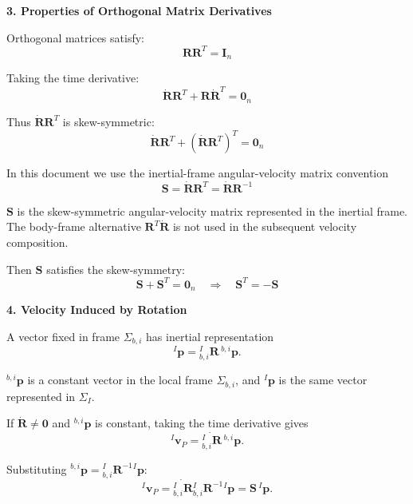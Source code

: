 \documentclass[12pt,a4paper]{report}
\newcommand{\newsymbols}[1]{\par\noindent{}#1\par\vspace{0.35em}}
\newcommand{\vect}[1]{\mathbf{#1}}
\newcommand{\mat}[1]{\mathbf{#1}}
\newcommand{\Frame}[1]{\Sigma_{#1}}
\newcommand{\Rot}[2]{{}_{#1}^{#2}\mathbf{R}}
\begin{document}
\textbf{3. Properties of Orthogonal Matrix Derivatives}

Orthogonal matrices satisfy:
\begin{equation}
\mat{R}\mat{R}^{T} = \mat{I}_{n}
\end{equation}

Taking the time derivative:
\begin{equation}
\dot{\mat{R}}\mat{R}^{T} + \mat{R}\dot{\mat{R}}^{T} = \mat{0}_{n}
\end{equation}

Thus $\dot{\mat{R}}\mat{R}^{T}$ is skew-symmetric:
\begin{equation}
\dot{\mat{R}}\mat{R}^{T} + (\dot{\mat{R}}\mat{R}^{T})^{T} = \mat{0}_{n}
\end{equation}

In this document we use the inertial-frame angular-velocity matrix convention
\begin{equation}
\mat{S} = \dot{\mat{R}}\mat{R}^{T} = \dot{\mat{R}}\mat{R}^{-1}
\end{equation}
\newsymbols{$\mat{S}$ is the skew-symmetric angular-velocity matrix represented in the inertial frame. The body-frame alternative $\mat{R}^{T}\dot{\mat{R}}$ is not used in the subsequent velocity composition.}

Then $\mat{S}$ satisfies the skew-symmetry:
\begin{equation}
\mat{S} + \mat{S}^{T} = \mat{0}_{n}
\quad \Rightarrow \quad
\mat{S}^{T} = -\mat{S}
\end{equation}

\textbf{4. Velocity Induced by Rotation}

A vector fixed in frame $\Frame{b,i}$ has inertial representation
\begin{equation}
{}^{I}\vect{p} = \Rot{b,i}{I}\,{}^{b,i}\vect{p}.
\end{equation}
\newsymbols{${}^{b,i}\vect{p}$ is a constant vector in the local frame $\Frame{b,i}$, and ${}^{I}\vect{p}$ is the same vector represented in $\Frame{I}$.}

If $\dot{\mat{R}} \neq \mat{0}$ and ${}^{b,i}\vect{p}$ is constant, taking the time derivative gives
\begin{equation}
{}^{I}\vect{v}_{P}
=
\dot{\Rot{b,i}{I}}\,{}^{b,i}\vect{p}.
\end{equation}

Substituting ${}^{b,i}\vect{p} = \Rot{b,i}{I}^{-1}{}^{I}\vect{p}$:
\begin{equation}
{}^{I}\vect{v}_{P}
=
\dot{\Rot{b,i}{I}}\Rot{b,i}{I}^{-1}{}^{I}\vect{p}
=
\mat{S}\,{}^{I}\vect{p}.
\end{equation}
\end{document}
